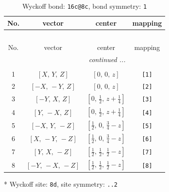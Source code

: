 \documentclass[fleqn,8pt]{jsarticle}
\begin{document}
\renewcommand{\arraystretch}{1.2}
\begin{longtable}{cccc}
\caption{Wyckoff bond: {\tt 16c@8c}, bond symmetry: {\tt 1}}
 \\
 \hline \hline
No. & vector & center & mapping \\ \hline \endfirsthead

\multicolumn{3}{l}{\tablename\ \thetable{}} \\
 \hline \hline
No. & vector & center & mapping \\ \hline \endhead

 \hline \hline
\multicolumn{3}{r}{\footnotesize\it continued ...} \\ \endfoot

 \hline \hline
\multicolumn{3}{r}{} \\ \endlastfoot

1 & $\left[ X,\, Y,\, Z \right]$ & $\left[ 0,\, 0,\, z \right]$ & {\tt [1]} \\ \hline
2 & $\left[ - X,\, - Y,\, Z \right]$ & $\left[ 0,\, 0,\, z \right]$ & {\tt [2]} \\ \hline
3 & $\left[ - Y,\, X,\, Z \right]$ & $\left[ 0,\, \frac{1}{2},\, z + \frac{1}{4} \right]$ & {\tt [3]} \\ \hline
4 & $\left[ Y,\, - X,\, Z \right]$ & $\left[ 0,\, \frac{1}{2},\, z + \frac{1}{4} \right]$ & {\tt [4]} \\ \hline
5 & $\left[ - X,\, Y,\, - Z \right]$ & $\left[ \frac{1}{2},\, 0,\, \frac{3}{4} - z \right]$ & {\tt [5]} \\ \hline
6 & $\left[ X,\, - Y,\, - Z \right]$ & $\left[ \frac{1}{2},\, 0,\, \frac{3}{4} - z \right]$ & {\tt [6]} \\ \hline
7 & $\left[ Y,\, X,\, - Z \right]$ & $\left[ \frac{1}{2},\, \frac{1}{2},\, \frac{1}{2} - z \right]$ & {\tt [7]} \\ \hline
8 & $\left[ - Y,\, - X,\, - Z \right]$ & $\left[ \frac{1}{2},\, \frac{1}{2},\, \frac{1}{2} - z \right]$ & {\tt [8]} \\
\end{longtable}
* Wyckoff site: {\tt 8d}, site symmetry: {\tt ..2}
\renewcommand{\arraystretch}{1.2}
\end{document}
